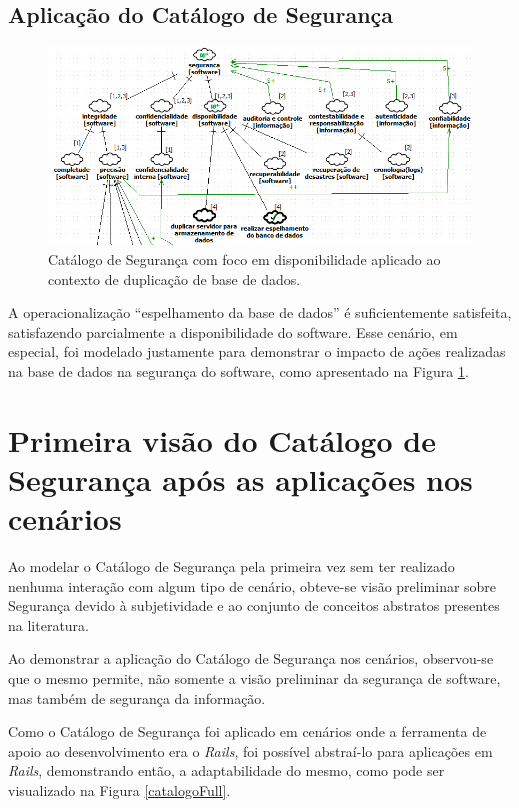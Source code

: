 \subsection{Aplicação do Catálogo de Segurança}

\begin{figure}[h!]
	\centering
	\includegraphics[keepaspectratio=true,scale=0.7]{figuras/catalogoPersona5.PNG}
	\caption{Catálogo de Segurança com foco em disponibilidade aplicado ao contexto de duplicação de base de dados.}
	\label{catalogoPersona5}
\end{figure}

A operacionalização “espelhamento da base de dados” é suficientemente satisfeita, satisfazendo parcialmente a disponibilidade do software. Esse cenário, em especial, foi modelado justamente para demonstrar o impacto de ações realizadas na base de dados na segurança do software, como apresentado na Figura \ref{catalogoPersona5}.


\section{Primeira visão do Catálogo de Segurança após as aplicações nos cenários}
\label{sec:aplicacaoDoCatalogo}

Ao modelar o Catálogo de Segurança pela primeira vez sem ter realizado nenhuma interação com algum tipo de cenário, obteve-se visão preliminar sobre Segurança devido à subjetividade e ao conjunto de conceitos abstratos presentes na literatura.  

Ao demonstrar a aplicação do Catálogo de Segurança nos cenários, observou-se que o mesmo permite, não somente a visão preliminar da segurança de software, mas também de segurança da informação.

Como o Catálogo de Segurança foi aplicado em cenários onde a ferramenta de apoio ao desenvolvimento era o \textit{Rails}, foi possível abstraí-lo para aplicações em \textit{Rails}, demonstrando então, a adaptabilidade do mesmo, como pode ser visualizado na Figura \ref{catalogoFull}.

